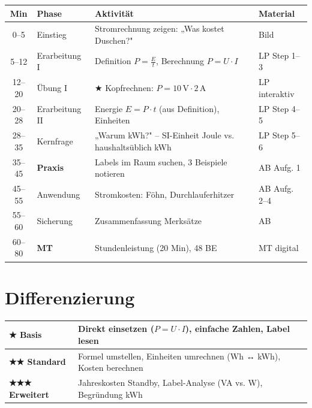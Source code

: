 \documentclass[11pt, a4paper]{article}
\newcommand{\ein}[1]{\,\mathrm{#1}}
\begin{document}
\renewcommand{\arraystretch}{1.3}
\begin{tabularx}{\linewidth}{|c|l|X|l|}
\hline
\textbf{Min} & \textbf{Phase} & \textbf{Aktivität} & \textbf{Material} \\
\hline
0–5 & Einstieg & Stromrechnung zeigen: „Was kostet Duschen?" & Bild \\
\hline
5–12 & Erarbeitung I & Definition $P = \frac{E}{t}$, Berechnung $P = U \cdot I$ & LP Step 1–3 \\
\hline
12–20 & Übung I & ★ Kopfrechnen: $P = 10\ein{V} \cdot 2\ein{A}$ & LP interaktiv \\
\hline
20–28 & Erarbeitung II & Energie $E = P \cdot t$ (aus Definition), Einheiten & LP Step 4–5 \\
\hline
28–35 & Kernfrage & „Warum kWh?" – SI-Einheit Joule vs. haushaltsüblich kWh & LP Step 5–6 \\
\hline
35–45 & \textbf{Praxis} & Labels im Raum suchen, 3 Beispiele notieren & AB Aufg. 1 \\
\hline
45–55 & Anwendung & Stromkosten: Föhn, Durchlauferhitzer & AB Aufg. 2–4 \\
\hline
55–60 & Sicherung & Zusammenfassung Merksätze & AB \\
\hline
60–80 & \textbf{MT} & Stundenleistung (20 Min), 48 BE & MT digital \\
\hline
\end{tabularx}
\renewcommand{\arraystretch}{1.0}


\section*{Differenzierung}

\begin{tabularx}{\linewidth}{|l|X|}
\hline
\textbf{★ Basis} & Direkt einsetzen ($P = U \cdot I$), einfache Zahlen, Label lesen \\
\hline
\textbf{★★ Standard} & Formel umstellen, Einheiten umrechnen (Wh ↔ kWh), Kosten berechnen \\
\hline
\textbf{★★★ Erweitert} & Jahreskosten Standby, Label-Analyse (VA vs. W), Begründung kWh \\
\hline
\end{tabularx}

\end{document}
